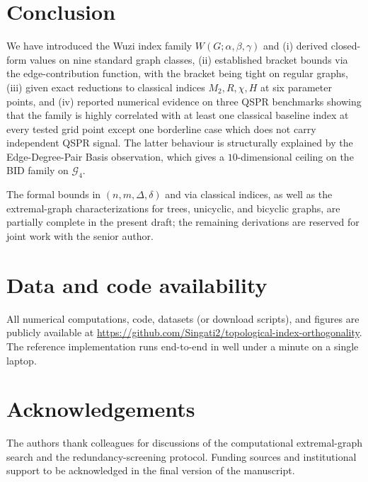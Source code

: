 \documentclass[11pt,a4paper]{article}
\theoremstyle{definition}
\newcommand{\Wuzi}{W(G;\alpha,\beta,\gamma)}
\begin{document}
\section{Conclusion}\label{sec:conclusion}

We have introduced the Wuzi index family $\Wuzi$ and (i) derived
closed-form values on nine standard graph classes, (ii) established
bracket bounds via the edge-contribution function, with the bracket
being tight on regular graphs, (iii) given exact reductions to
classical indices $M_2,R,\chi,H$ at six parameter points, and
(iv) reported numerical evidence on three QSPR benchmarks showing
that the family is highly correlated with at least one classical
baseline index at every tested grid point except one borderline
case which does not carry independent QSPR signal. The latter
behaviour is structurally explained by the Edge-Degree-Pair Basis
observation, which gives a $10$-dimensional ceiling on the BID
family on $\mathcal{G}_4$.

The formal bounds in $(n,m,\Delta,\delta)$ and via classical
indices, as well as the extremal-graph characterizations for
trees, unicyclic, and bicyclic graphs, are partially complete in
the present draft; the remaining derivations are reserved for
joint work with the senior author.

\section*{Data and code availability}

All numerical computations, code, datasets (or download scripts),
and figures are publicly available at
\url{https://github.com/Singati2/topological-index-orthogonality}.
The reference implementation runs end-to-end in well under a
minute on a single laptop.

\section*{Acknowledgements}

The authors thank colleagues for discussions of the computational
extremal-graph search and the redundancy-screening protocol.
Funding sources and institutional support to be acknowledged in
the final version of the manuscript.
\end{document}
